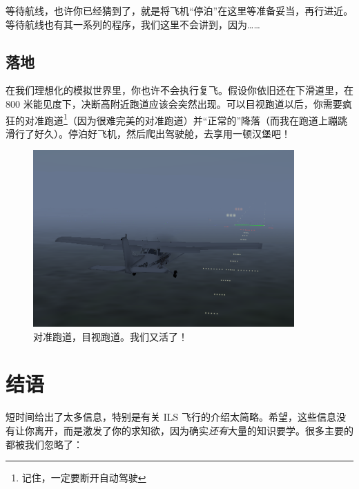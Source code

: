 等待航线，也许你已经猜到了，就是将飞机“停泊”在这里等准备妥当，再行进近。等待航线也有其一系列的程序，我们这里不会讲到，因为……

\subsection{落地}

在我们理想化的模拟世界里，你也许不会执行复飞。假设你依旧还在下滑道里，在 800 米能见度下，决断高附近跑道应该会突然出现。可以目视跑道以后，你需要疯狂的对准跑道\footnote{记住，一定要断开自动驾驶}（因为很难完美的对准跑道）并“正常的”降落（而我在跑道上蹦跳滑行了好久）。停泊好飞机，然后爬出驾驶舱，去享用一顿汉堡吧！

\begin{figure}
  \begin{center}
    \includegraphics[width=10cm]{img/DH_plane_clipped}
    \caption{对准跑道，目视跑道。我们又活了！}
    \label{fig:DH_plane_clipped}
  \end{center}
\end{figure}

\section{结语}

短时间给出了太多信息，特别是有关 ILS 飞行的介绍太简略。希望，这些信息没有让你离开，而是激发了你的求知欲，因为确实\emph{还有}大量的知识要学。很多主要的都被我们忽略了：

